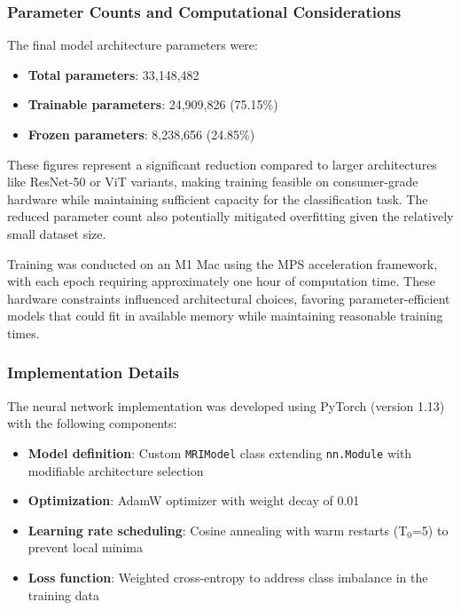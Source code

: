\documentclass[12pt, a4paper]{article}
\begin{document}
\subsubsection{Parameter Counts and Computational Considerations}

The final model architecture parameters were:

\begin{itemize}
    \item \textbf{Total parameters}: 33,148,482
    \item \textbf{Trainable parameters}: 24,909,826 (75.15\%)
    \item \textbf{Frozen parameters}: 8,238,656 (24.85\%)
\end{itemize}

These figures represent a significant reduction compared to larger architectures like ResNet-50 or ViT variants, making training feasible on consumer-grade hardware while maintaining sufficient capacity for the classification task. The reduced parameter count also potentially mitigated overfitting given the relatively small dataset size.

Training was conducted on an M1 Mac using the MPS acceleration framework, with each epoch requiring approximately one hour of computation time. These hardware constraints influenced architectural choices, favoring parameter-efficient models that could fit in available memory while maintaining reasonable training times.

\subsubsection{Implementation Details}

The neural network implementation was developed using PyTorch (version 1.13) with the following components:

\begin{itemize}
    \item \textbf{Model definition}: Custom \texttt{MRIModel} class extending \texttt{nn.Module} with modifiable architecture selection
    \item \textbf{Optimization}: AdamW optimizer with weight decay of 0.01
    \item \textbf{Learning rate scheduling}: Cosine annealing with warm restarts (T$_0$=5) to prevent local minima
    \item \textbf{Loss function}: Weighted cross-entropy to address class imbalance in the training data
\end{itemize}
\end{document}
